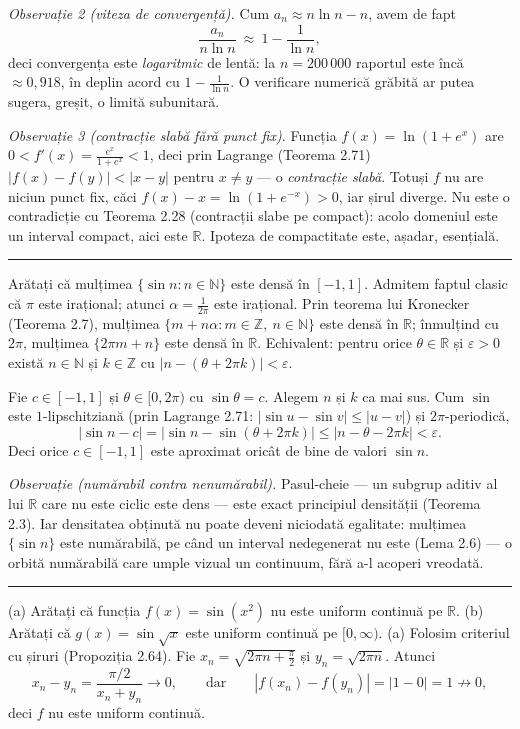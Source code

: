 \emph{Observație 2 (viteza de convergență).} Cum $a_n\approx n\ln n-n$, avem de fapt
\[ \frac{a_n}{n\ln n}\ \approx\ 1-\frac{1}{\ln n} , \]
deci convergența este \emph{logaritmic} de lentă: la $n=200\,000$ raportul este încă $\approx0{,}918$, în deplin acord cu $1-\frac{1}{\ln n}$. O verificare numerică grăbită ar putea sugera, greșit, o limită subunitară.

\emph{Observație 3 (contracție slabă fără punct fix).} Funcția $f(x)=\ln(1+e^x)$ are $0<f'(x)=\frac{e^x}{1+e^x}<1$, deci prin Lagrange (Teorema 2.71) $|f(x)-f(y)|<|x-y|$ pentru $x\neq y$ --- o \emph{contracție slabă}. Totuși $f$ nu are niciun punct fix, căci $f(x)-x=\ln(1+e^{-x})>0$, iar șirul diverge. Nu este o contradicție cu Teorema 2.28 (contracții slabe pe compact): acolo domeniul este un interval compact, aici este $\mathbb{R}$. Ipoteza de compactitate este, așadar, esențială.
\vspace{1mm}\hrule

Arătați că mulțimea $\{\sin n : n\in\mathbb{N}\}$ este densă în $[-1,1]$.
\sol Admitem faptul clasic că $\pi$ este irațional; atunci $\alpha=\frac1{2\pi}$ este irațional. Prin teorema lui Kronecker (Teorema 2.7), mulțimea $\{m+n\alpha:m\in\mathbb{Z},\ n\in\mathbb{N}\}$ este densă în $\mathbb{R}$; înmulțind cu $2\pi$, mulțimea $\{2\pi m+n\}$ este densă în $\mathbb{R}$. Echivalent: pentru orice $\theta\in\mathbb{R}$ și $\varepsilon>0$ există $n\in\mathbb{N}$ și $k\in\mathbb{Z}$ cu $|n-(\theta+2\pi k)|<\varepsilon$.

Fie $c\in[-1,1]$ și $\theta\in[0,2\pi)$ cu $\sin\theta=c$. Alegem $n$ și $k$ ca mai sus. Cum $\sin$ este $1$-lipschitziană (prin Lagrange 2.71: $|\sin u-\sin v|\le|u-v|$) și $2\pi$-periodică,
\[ |\sin n-c|=\bigl|\sin n-\sin(\theta+2\pi k)\bigr|\le|n-\theta-2\pi k|<\varepsilon . \]
Deci orice $c\in[-1,1]$ este aproximat oricât de bine de valori $\sin n$.

\emph{Observație (numărabil contra nenumărabil).} Pasul-cheie --- un subgrup aditiv al lui $\mathbb{R}$ care nu este ciclic este dens --- este exact principiul densității (Teorema 2.3). Iar densitatea obținută nu poate deveni niciodată egalitate: mulțimea $\{\sin n\}$ este numărabilă, pe când un interval nedegenerat nu este (Lema 2.6) --- o orbită numărabilă care umple vizual un continuum, fără a-l acoperi vreodată.
\vspace{1mm}\hrule

(a) Arătați că funcția $f(x)=\sin(x^2)$ nu este uniform continuă pe $\mathbb{R}$.
(b) Arătați că $g(x)=\sin\sqrt{x}$ este uniform continuă pe $[0,\infty)$.
\sol (a) Folosim criteriul cu șiruri (Propoziția 2.64). Fie $x_n=\sqrt{2\pi n+\frac\pi2}$ și $y_n=\sqrt{2\pi n}$. Atunci
\[ x_n-y_n=\frac{\pi/2}{x_n+y_n}\to0,\qquad\text{dar}\qquad |f(x_n)-f(y_n)|=|1-0|=1\not\to0, \]
deci $f$ nu este uniform continuă.

